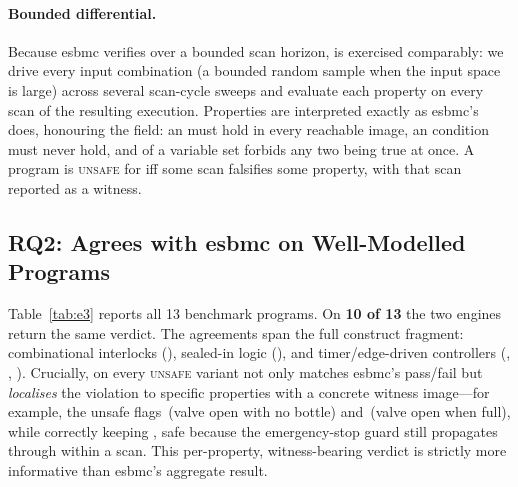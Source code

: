 \paragraph{Bounded differential.} Because \gls{esbmc} verifies over a bounded scan
horizon, \kld{} is exercised comparably: we drive every input combination (a bounded
random sample when the input space is large) across several scan-cycle sweeps and
evaluate each property on every scan of the resulting execution. Properties are
interpreted exactly as \gls{esbmc}'s  does, honouring the
 field: an  must hold in every reachable image, an
 condition must never hold, and  of a variable
set forbids any two being true at once. A program is \textsc{unsafe} for \kld{} iff
some scan falsifies some property, with that scan reported as a witness.

\subsection{RQ2: \kld{} Agrees with \texorpdfstring{\gls{esbmc}}{ESBMC} on Well-Modelled Programs}
\label{sec:e3:rq2}

Table~\ref{tab:e3} reports all 13 benchmark programs. On \textbf{10 of 13} the two
engines return the same verdict. The agreements span the full construct fragment:
combinational interlocks (), sealed-in logic
(), and timer/edge-driven controllers (,
, ). Crucially, on every \textsc{unsafe}
variant \kld{} not only matches \gls{esbmc}'s pass/fail but \emph{localises} the
violation to specific properties with a concrete witness image---for example, the
unsafe  flags \,(valve open with no bottle) and
\,(valve open when full), while correctly keeping , safe
because the emergency-stop guard still propagates through  within
a scan. This per-property, witness-bearing verdict is strictly more informative than
\gls{esbmc}'s aggregate result.

